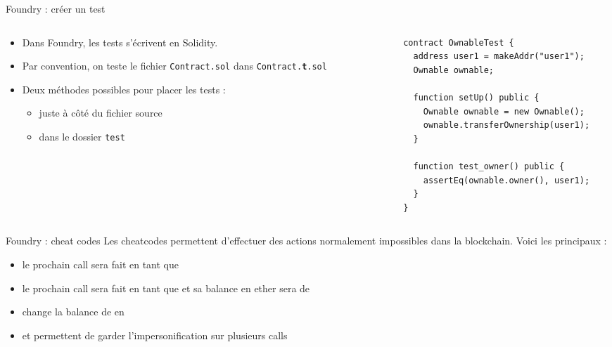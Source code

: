 \begin{frame}[fragile]{Foundry : créer un test}
  \begin{columns}
    \begin{column}{0.47\textwidth}
      \begin{itemize}
        \item Dans Foundry, les tests s'écrivent en Solidity.
        \item Par convention, on teste le fichier \texttt{Contract.sol} dans \texttt{Contract.\textbf{t}.sol}
        \item Deux méthodes possibles pour placer les tests :
              \begin{itemize}
                \item juste à côté du fichier source
                \item dans le dossier \texttt{test}
              \end{itemize}
      \end{itemize}
    \end{column}
    \hspace{0.03\textwidth}
    \begin{column}{0.47\textwidth}
      \begin{verbatim}
        contract OwnableTest {
          address user1 = makeAddr("user1");
          Ownable ownable;

          function setUp() public {
            Ownable ownable = new Ownable();
            ownable.transferOwnership(user1);
          }

          function test_owner() public {
            assertEq(ownable.owner(), user1);
          }
        }
      \end{verbatim}
    \end{column}
  \end{columns}
\end{frame}

\begin{frame}[fragile]{Foundry : cheat codes}
  Les cheatcodes permettent d'effectuer des actions normalement impossibles dans la blockchain.
  Voici les principaux :

  \begin{itemize}
    \item {} le prochain call sera fait en tant que 
    \item {} le prochain call sera fait en tant que  et sa balance en ether sera de 
    \item {} change la balance de  en 
    \item {} et  permettent de garder l'impersonification sur plusieurs calls
  \end{itemize}
\end{frame}

